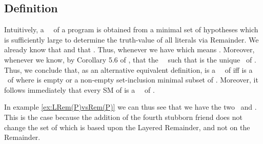 \documentclass{llncs}
\begin{document}
		\subsection{Definition}
Intuitively, a \MH\ \m\ of a program is obtained from a minimal set of hypotheses which is sufficiently large to determine the truth-value of all literals via Remainder.
			We already know that  and that .
			Thus, whenever  we have  which means .
			Moreover, whenever  we know, by Corollary 5.6 of \cite{WFS}, that the \twov\ \m\  such that 
			 is the unique \sm\ of .
			Thus, we conclude that, as an alternative equivalent definition,  is a \MH\ \m\ of  iff  is a \sm\ of  where  is 
			empty or a non-empty set-inclusion minimal subset of .
			Moreover, it follows immediately that every SM of  is a \MH\ \m\ of .			


				In example \ref{ex:LRem(P)vsRem(P)} we can thus see that we have the two \ms\  and 
			.
			This is the case because the addition of the fourth stubborn friend does not change the set of  which is based upon the Layered
			Remainder, and not on the Remainder.
			
\end{document}
